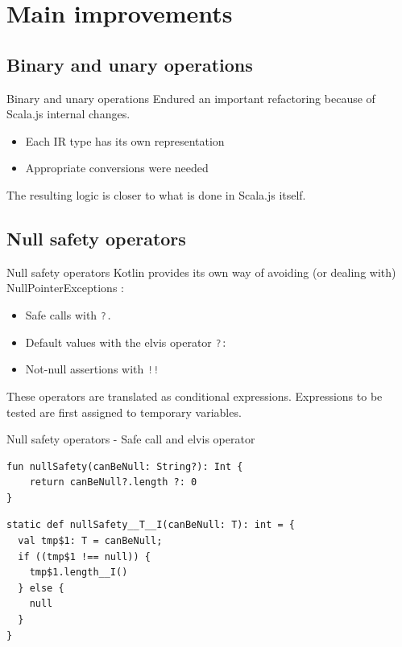 \documentclass[10pt,usenames,dvipsnames]{beamer}
\newcommand{\inlinecode}[2]{\colorbox{minted-bg}{\lstinline[language=#1]$#2$}}
\newcommand{\ktinline}[1]{\inlinecode{kotlin}{#1}}
\begin{document}
\section{Main improvements}


\subsection{Binary and unary operations}


\begin{frame}[fragile]{Binary and unary operations}
  Endured an important refactoring because of Scala.js internal changes.
  
  \begin{itemize}
   \item Each IR type has its own representation
   \item Appropriate conversions were needed
  \end{itemize}
  
  The resulting logic is closer to what is done in Scala.js itself.

\end{frame}

\subsection{Null safety operators}


\begin{frame}[fragile]{Null safety operators}
 Kotlin provides its own way of avoiding (or dealing with) NullPointerExceptions :
 
 \begin{itemize}
  \item Safe calls with \ktinline{?.}
  \item Default values with the elvis operator \ktinline{?:}
  \item Not-null assertions with \ktinline{!!}
 \end{itemize}

 These operators are translated as conditional expressions. Expressions to be tested are first assigned to temporary variables.
 
\end{frame}

\begin{frame}[fragile]{Null safety operators - Safe call and elvis operator}

\begin{verbatim}
fun nullSafety(canBeNull: String?): Int {
    return canBeNull?.length ?: 0
}
\end{verbatim}

 \begin{verbatim}
static def nullSafety__T__I(canBeNull: T): int = {
  val tmp$1: T = canBeNull;
  if ((tmp$1 !== null)) {
    tmp$1.length__I()
  } else {
    null
  }
}
 \end{verbatim}

\end{frame}
\end{document}
